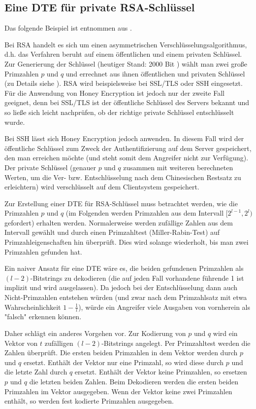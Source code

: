 \subsection{Eine DTE für private RSA-Schlüssel}

Das folgende Beispiel ist entnommen aus \cite{EURO2014}.

Bei RSA handelt es sich um einen asymmetrischen Verschlüsselungsalgorithmus, d.h. das Verfahren beruht auf einem öffentlichen und einem privaten Schlüssel. Zur Generierung der Schlüssel (heutiger Stand: 2000 Bit \cite{BSI2014}) wählt man zwei große  Primzahlen \(p\) und \(q\) und errechnet aus ihnen öffentlichen und privaten Schlüssel (zu Details siehe \cite{Schneier2006}). RSA wird beispielsweise bei SSL/TLS oder SSH eingesetzt. Für die Anwendung von Honey Encryption ist jedoch nur der zweite Fall geeignet, denn bei SSL/TLS ist der öffentliche Schlüssel des Servers bekannt und so ließe sich leicht nachprüfen, ob der richtige private Schlüssel entschlüsselt wurde. 

Bei SSH lässt sich Honey Encryption jedoch anwenden. In diesem Fall wird der öffentliche Schlüssel zum Zweck der Authentifizierung auf dem Server gespeichert, den man erreichen möchte (und steht somit dem Angreifer nicht zur Verfügung). Der private Schlüssel (genauer \(p\) und \(q\) zusammen mit weiteren berechneten Werten, um die Ver- bzw. Entschlüsselung nach dem Chinesischen Restsatz zu erleichtern) wird verschlüsselt auf dem Clientsystem gespeichert. 

Zur Erstellung einer DTE für RSA-Schlüssel muss betrachtet werden, wie die Primzahlen \(p\) und \(q\) (im Folgenden werden Primzahlen aus dem Intervall \([2^{l-1},2^l)\) gefordert) erhalten werden. Normalerweise werden zufällige Zahlen aus dem Intervall gewählt und durch einen Primzahltest (Miller-Rabin-Test) auf Primzahleigenschaften hin überprüft. Dies wird solange wiederholt, bis man zwei Primzahlen gefunden hat. 

Ein naiver Ansatz für eine DTE wäre es, die beiden gefundenen Primzahlen als \((l-2)\)-Bitstrings zu dekodieren (die auf jeden Fall vorhandene führende 1 ist implizit und wird ausgelassen). Da jedoch bei der Entschlüsselung dann auch Nicht-Primzahlen entstehen würden (und zwar nach dem Primzahlsatz mit etwa Wahrscheinlichkeit \(1-\frac{1}{l}\)), würde ein Angreifer viele Ausgaben von vornherein als "falsch" erkennen können.

Daher schlägt \cite{EURO2014} ein anderes Vorgehen vor. Zur Kodierung von \(p\) und \(q\) wird ein Vektor von \(t\) zufälligen \((l-2)\)-Bitstrings angelegt. Per Primzahltest werden die Zahlen überprüft. Die ersten beiden Primzahlen in dem Vektor werden durch \(p\) und \(q\) ersetzt. Enthält der Vektor nur eine Primzahl, so wird diese durch \(p\) und die letzte Zahl durch \(q\) ersetzt. Enthält der Vektor keine Primzahlen, so ersetzen \(p\) und \(q\) die letzten beiden Zahlen. Beim Dekodieren werden die ersten beiden Primzahlen im Vektor ausgegeben. Wenn der Vektor keine zwei Primzahlen enthält, so werden fest kodierte Primzahlen ausgegeben.

